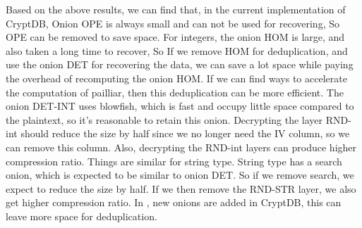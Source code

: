 




Based on the above results, we can find that, in the current implementation of CryptDB, Onion OPE is always small and can not be used for recovering, So OPE can be removed  to save space. For integers, the onion HOM is large, and also taken a long time to recover, So If we remove HOM for deduplication, and use the onion DET for recovering the data, we can save a lot space while paying the overhead of recomputing the onion HOM. If we can find ways to accelerate the computation of pailliar, then this deduplication can be more efficient. The onion DET-INT uses blowfish, which is fast and occupy little space compared to the plaintext, so it's reasonable to retain this onion. Decrypting the layer RND-int should reduce the size by half since we no longer need the IV column, so we can remove this column. Also, decrypting the RND-int layers can produce higher compression ratio. Things are similar for string type. String type has a search onion, which is expected to be similar to onion DET. So if we remove search, we expect to reduce the size by half. If we then remove the RND-STR layer, we also get higher compression ratio. In \citep{popa2015guidelines}, new onions are added in CryptDB, this can leave more space for deduplication.






